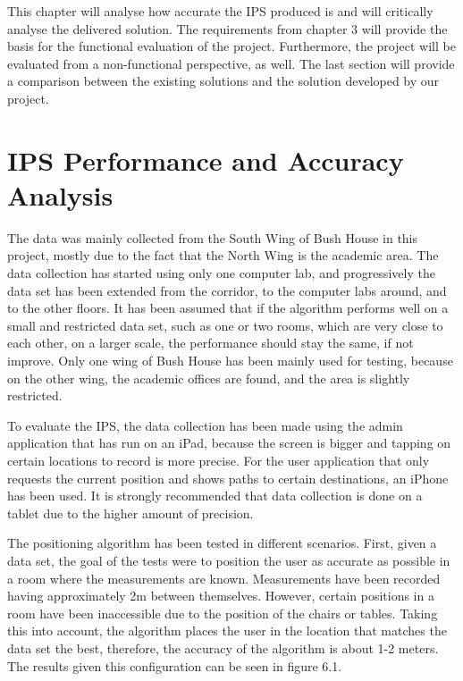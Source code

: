 This chapter will analyse how accurate the IPS produced is and will critically analyse the delivered solution. The requirements from chapter 3 will provide the basis for the functional evaluation of the project. Furthermore, the project will be evaluated from a non-functional perspective, as well. The last section will provide a comparison between the existing solutions and the solution developed by our project.

\section{IPS Performance and Accuracy Analysis}
\label{sec:accuracy}

The data was mainly collected from the South Wing of Bush House in this project, mostly due to the fact that the North Wing is the academic area. The data collection has started using only one computer lab, and progressively the data set has been extended from the corridor, to the computer labs around, and to the other floors. It has been assumed that if the algorithm performs well on a small and restricted data set, such as one or two rooms, which are very close to each other, on a larger scale, the performance should stay the same, if not improve. Only one wing of Bush House has been mainly used for testing, because on the other wing, the academic offices are found, and the area is slightly restricted. 

To evaluate the IPS, the data collection has been made using the admin application that has run on an iPad, because the screen is bigger and tapping on certain locations to record is more precise. For the user application that only requests the current position and shows paths to certain destinations, an iPhone has been used. It is strongly recommended that data collection is done on a tablet due to the higher amount of precision.

The positioning algorithm has been tested in different scenarios. First, given a data set, the goal of the tests were to position the user as accurate as possible in a room where the measurements are known. Measurements have been recorded having approximately 2m between themselves. However, certain positions in a room have been inaccessible due to the position of the chairs or tables. Taking this into account, the algorithm places the user in the location that matches the data set the best, therefore, the accuracy of the algorithm is about 1-2 meters. The results given this configuration can be seen in figure 6.1. 

